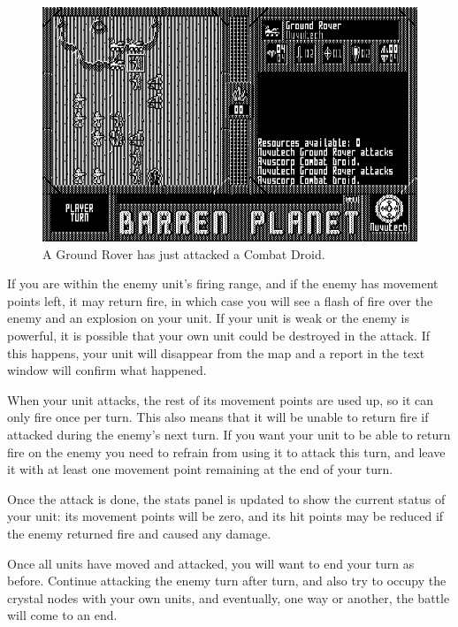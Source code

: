 \begin{figure}[h]
  \includegraphics[width=\textwidth]{attack}
  \caption{A Ground Rover has just attacked a Combat Droid.}
\end{figure}

If you are within the enemy unit's firing range, and if the enemy has movement points left, it may return fire, in which case you will see a flash of fire over the enemy and an explosion on your unit. If your unit is weak or the enemy is powerful, it is possible that your own unit could be destroyed in the attack. If this happens, your unit will disappear from the map and a report in the text window will confirm what happened.

When your unit attacks, the rest of its movement points are used up, so it can only fire once per turn. This also means that it will be unable to return fire if attacked during the enemy's next turn. If you want your unit to be able to return fire on the enemy you need to refrain from using it to attack this turn, and leave it with at least one movement point remaining at the end of your turn.

Once the attack is done, the stats panel is updated to show the current status of your unit: its movement points will be zero, and its hit points may be reduced if the enemy returned fire and caused any damage.

Once all units have moved and attacked, you will want to end your turn as before. Continue attacking the enemy turn after turn, and also try to occupy the crystal nodes with your own units, and eventually, one way or another, the battle will come to an end.

